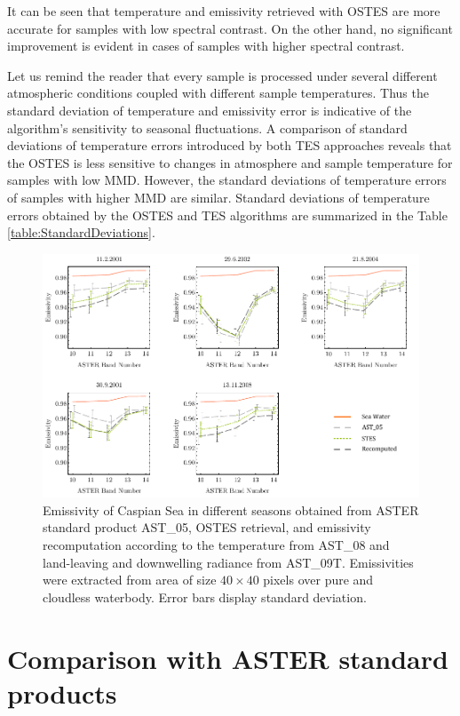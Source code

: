 It can be seen that temperature and emissivity retrieved with OSTES are more accurate for samples with low spectral contrast. On the other hand, no significant improvement is evident in cases of samples with higher spectral contrast. 

Let us remind the reader that every sample is processed under several different atmospheric conditions coupled with different sample temperatures. Thus the standard deviation of temperature and emissivity error is indicative of the algorithm’s sensitivity to seasonal fluctuations. A comparison of standard deviations of temperature errors introduced by both TES approaches reveals that the OSTES is less sensitive to changes in atmosphere and sample temperature for samples with low MMD. However, the standard deviations of temperature errors of samples with higher MMD are similar. Standard deviations of temperature errors obtained by the OSTES and TES algorithms are summarized in the Table \ref{table:StandardDeviations}.

\begin{figure}[!t]
\centering
\includegraphics[width=0.95\linewidth]{pics/Chapter_04/Caspian.pdf}
\vspace{1.5 em}
\caption{Emissivity of Caspian Sea in different seasons obtained from ASTER standard product AST\_05, OSTES retrieval, and emissivity recomputation according to the temperature from AST\_08 and land-leaving and downwelling radiance from AST\_09T. Emissivities were extracted from area of size $40 \times 40$ pixels over pure and cloudless waterbody. Error bars display standard deviation.}
\label{fig:CaspianSeaEmissivity}
\end{figure}

\section{Comparison with ASTER standard products}

